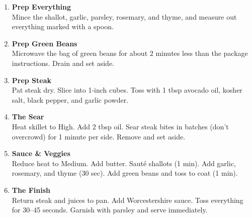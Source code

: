\begin{enumerate}

      \item \textbf{Prep Everything} \\
            Mince the shallot, garlic, parsley, rosemary, and thyme, and measure out everything marked with a spoon.

      \item \textbf{Prep Green Beans} \\
            Microwave the bag of green beans for about 2 minutes less than the package instructions. Drain and set aside.

      \item \textbf{Prep Steak} \\
            Pat steak dry. Slice into 1-inch cubes. Toss with 1 tbsp avocado oil, kosher salt, black pepper, and garlic powder.

      \item \textbf{The Sear} \\
            Heat skillet to High. Add 2 tbsp oil. Sear steak bites in batches (don't overcrowd) for 1 minute per side. Remove and set aside.

      \item \textbf{Sauce \& Veggies} \\
            Reduce heat to Medium. Add butter. Sauté shallots (1 min). Add garlic, rosemary, and thyme (30 sec). Add green beans and toss to coat (1 min).

      \item \textbf{The Finish} \\
            Return steak and juices to pan. Add Worcestershire sauce. Toss everything for 30–45 seconds. Garnish with parsley and serve immediately.

\end{enumerate}



